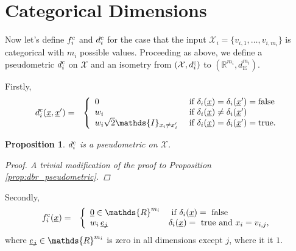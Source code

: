 \documentclass[letterpaper]{article}
\newcommand{\vect}[1]{\underline{\smash{#1}}}
\renewcommand{\v}[1]{\vect{#1}}
\newcommand{\reals}{\mathds{R}}
\newcommand{\sX}{\mathcal{X}}
\newcommand{\cat}{^{\text{\textnormal{c}}}}
\newtheorem{prop}[thm]{Proposition}
\newcommand{\indicator}{\ensuremath\mathds{I}}
\begin{document}
\section{Categorical Dimensions}

Now let's define $f\cat_i$ and $d\cat_i$ for the case that the input $\sX_i=\{v_{i,1}, \dots, v_{i,m_i}\}$ is categorical with $m_i$ possible values. 
Proceeding as above, we define a pseudometric $d\cat_i$ on $\sX$ and an isometry from $(\sX, d\cat_i)$ to $(\reals^{m_i},d_{\text{E}}^{m_i})$. 

Firstly,
\begin{eqnarray}
\nonumber{}d\cat_i(\v{x}, \v{x}') & = & \left\{
\begin{array}{ll}
\nonumber{} 0 & \textrm{ if } \delta_i(\v{x}) = \delta_i(\v{x}') = \textrm{false}\\
\nonumber{} w_i & \textrm{ if } \delta_i(\v{x}) \neq \delta_i(\v{x}')\\
\nonumber{} w_i \sqrt{2} \indicator_{x_i \neq x_i'} 
& \textrm{ if } \delta_i(\v{x}) = \delta_i(\v{x}') = \textrm{true}.
\end{array}
\right.
\end{eqnarray}

\begin{prop}
 $d\cat_i$ is a pseudometric on $\sX$.
 \begin{proof}
 A trivial modification of the proof to Proposition \ref{prop:dbr_pseudometric}.
 \end{proof}
\end{prop}

Secondly,
\begin{eqnarray}
\nonumber{}f\cat_i(\v{x}) & = & \left\{\begin{array}{ll}
\v{0} \in \reals^{m_i} & \textrm{ if } \delta_i(\v{x}) = \textrm{ false }\\
\nonumber{} w_i\,\v{e_j} & \delta_i(\v{x}) = \textrm{ true and } x_i = v_{i,j},
\end{array}\right.
\end{eqnarray}
\noindent{}where $\v{e_j} \in \reals^{m_i}$ is zero in all dimensions except $j$, where it it $1$.
\end{document}
